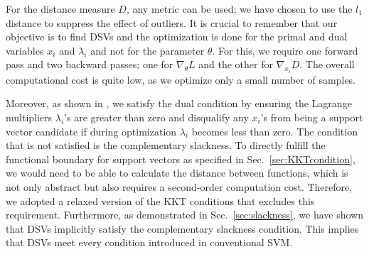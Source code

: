 %
For the distance measure $D$, any metric can be used; we have chosen to use the $l_1$ distance to suppress the effect of outliers. It is crucial to remember that our objective is to find DSVs and the optimization is done for the primal and dual variables $x_i$ and $\lambda_i$ and not for the parameter $\theta$. %
For this, we require one forward pass and two backward passes; one for $\nabla_\theta L$ and the other for $\nabla_{x_i} D$. The overall computational cost is quite low, as we optimize only a small number of samples.

Moreover, as shown in , 
we satisfy the dual condition by ensuring the Lagrange multipliers $\lambda_i$'s are greater than zero and disqualify any $x_i$'s from being a support vector candidate if during optimization $\lambda_i$ becomes less than zero. The condition that is not  satisfied is the complementary slackness. To directly fulfill the functional boundary for support vectors as specified in Sec.~\ref{sec:KKTcondition}, we would need to be able to calculate the distance between functions, which is not only abstract but also requires a second-order computation cost. Therefore, we adopted a relaxed version of the KKT conditions that excludes this requirement. Furthermore, as demonstrated in Sec.~\ref{sec:slackness}, we have shown that DSVs implicitly satisfy the complementary slackness condition. This implies that DSVs meet every condition introduced in conventional SVM.








